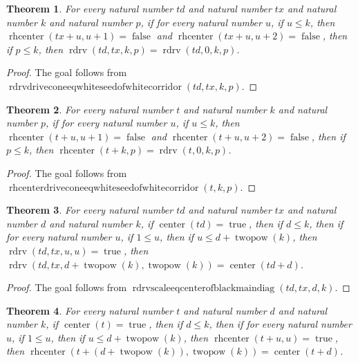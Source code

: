 \documentclass[11pt]{article}
\newtheorem{theorem}{Theorem}[section]
\theoremstyle{definition}
\begin{document}
\begin{theorem}
\label{ll:paper:rdrv-drive-cone-eq-white-seed-of-white-corridor}
For every natural number \(td\) and natural number \(tx\) and natural number \(k\) and natural number \(p\), if for every natural number \(u\), if \(u \le k\), then \(\operatorname{rhcenter}(tx + u, u + 1) = \operatorname{false}\) and \(\operatorname{rhcenter}(tx + u, u + 2) = \operatorname{false}\), then if \(p \le k\), then \(\operatorname{rdrv}(td, tx, k, p) = \operatorname{rdrv}(td, 0, k, p)\).
\end{theorem}
\begin{proof}
The goal follows from \(\operatorname{rdrvdriveconeeqwhiteseedofwhitecorridor}(td, tx, k, p)\).
\end{proof}
\begin{theorem}
\label{ll:paper:rhcenter-drive-cone-eq-white-seed-of-white-corridor}
For every natural number \(t\) and natural number \(k\) and natural number \(p\), if for every natural number \(u\), if \(u \le k\), then \(\operatorname{rhcenter}(t + u, u + 1) = \operatorname{false}\) and \(\operatorname{rhcenter}(t + u, u + 2) = \operatorname{false}\), then if \(p \le k\), then \(\operatorname{rhcenter}(t + k, p) = \operatorname{rdrv}(t, 0, k, p)\).
\end{theorem}
\begin{proof}
The goal follows from \(\operatorname{rhcenterdriveconeeqwhiteseedofwhitecorridor}(t, k, p)\).
\end{proof}
\begin{theorem}
\label{ll:paper:rdrv-scale-eq-center-of-black-main-diag}
For every natural number \(td\) and natural number \(tx\) and natural number \(d\) and natural number \(k\), if \(\operatorname{center}(td) = \operatorname{true}\), then if \(d \le k\), then if for every natural number \(u\), if \(1 \le u\), then if \(u \le d + \operatorname{twopow}(k)\), then \(\operatorname{rdrv}(td, tx, u, u) = \operatorname{true}\), then \(\operatorname{rdrv}(td, tx, d + \operatorname{twopow}(k), \operatorname{twopow}(k)) = \operatorname{center}(td + d)\).
\end{theorem}
\begin{proof}
The goal follows from \(\operatorname{rdrvscaleeqcenterofblackmaindiag}(td, tx, d, k)\).
\end{proof}
\begin{theorem}
\label{ll:paper:rhcenter-scale-eq-center-of-black-diag}
For every natural number \(t\) and natural number \(d\) and natural number \(k\), if \(\operatorname{center}(t) = \operatorname{true}\), then if \(d \le k\), then if for every natural number \(u\), if \(1 \le u\), then if \(u \le d + \operatorname{twopow}(k)\), then \(\operatorname{rhcenter}(t + u, u) = \operatorname{true}\), then \(\operatorname{rhcenter}(t + (d + \operatorname{twopow}(k)), \operatorname{twopow}(k)) = \operatorname{center}(t + d)\).
\end{theorem}
\end{document}
